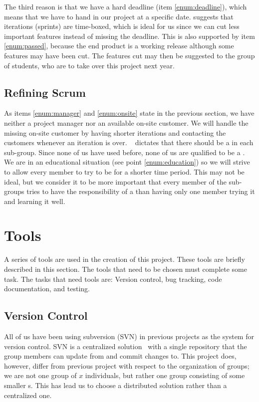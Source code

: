 The third reason is that we have a hard deadline (item \ref{enum:deadline}), which means that we have to hand in our project at a specific date.
\Sos{} suggests that iterations (sprints) are time-boxed, which is ideal for us since we can cut less important features instead of missing the deadline.
This is also supported by item \ref{enum:passed}, because the end product is a working release although some features may have been cut.
The features cut may then be suggested to the group of students, who are to take over this project next year.


\subsection{Refining Scrum} 
\label{sub:rescrum}
As items \ref{enum:manager} and \ref{enum:onsite} state in the previous section, we have neither a project manager nor an available on-site customer.
We will handle the missing on-site customer by having shorter iterations and contacting the customers whenever an iteration is over.
\Sos{}~\cite{scrumOfScrums} dictates that there should be a \scrummaster{} in each sub-group.
Since none of us have used \scrum{} before, none of us are qualified to be a \scrummaster{}.
We are in an educational situation (see point \ref{enum:education}) so we will strive to allow every member to try to be \scrummaster{} for a shorter time period.
This may not be ideal, but we consider it to be more important that every member of the sub-groups tries to have the responsibility of a \scrummaster{} than having only one member trying it and learning it well.

\begin{comment}
There is more:
*Scrum board
*The phases / meetings
**estimation
**sprint planning
*Scrum meetings
*Scrum of scrum def
*project manager problem
\end{comment}


\section{Tools}\label{subsec:tools}
A series of tools are used in the creation of this project.
These tools are briefly described in this section.
The tools that need to be chosen must complete some task. 
The tasks that need tools are: Version control, bug tracking, code documentation, and testing.

\subsection{Version Control}
All of us have been using subversion (SVN) in previous projects as the system for version control.
SVN is a centralized solution~\cite{subversion} with a single repository that the group members can update from and commit changes to.
This project does, however, differ from previous project with respect to the organization of groups; we are not one group of $x$ individuals, but rather one group consisting of some smaller \subgroup{}s.
This has lead us to choose a distributed solution rather than a centralized one.

